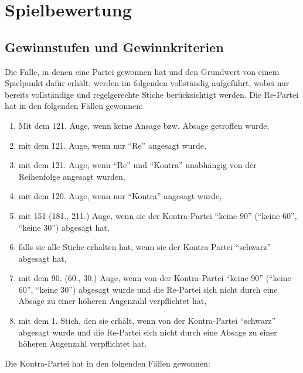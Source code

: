 \documentclass[12pt]{scrartcl}
\begin{document}
\section{Spielbewertung}

\subsection{Gewinnstufen und Gewinnkriterien}
Die Fälle, in denen eine Partei gewonnen hat und den Grundwert von einem Spielpunkt dafür erhält,
werden im folgenden vollständig aufgeführt, wobei nur bereits vollständige
und regelgerechte Stiche berücksichtigt werden.
Die Re-Partei hat in den folgenden Fällen gewonnen:
\begin{enumerate}
  \item Mit dem 121. Auge, wenn keine Ansage bzw. Absage getroffen wurde,
  \item mit dem 121. Auge, wenn nur "`Re"' angesagt wurde,
  \item mit dem 121. Auge, wenn "`Re"' und "`Kontra"' unabhängig von der Reihenfolge angesagt wurden,
  \item mit dem 120. Auge, wenn nur "`Kontra"' angesagt wurde,
  \item mit 151 (181., 211.) Auge, wenn sie der Kontra-Partei "`keine 90"' ("`keine 60"', "`keine 30"') abgesagt hat,
  \item falls sie alle Stiche erhalten hat, wenn sie der Kontra-Partei "`schwarz"' abgesagt hat,
  \item mit dem 90. (60., 30.) Auge, wenn von der Kontra-Partei "`keine 90"' ("`keine 60"', "`keine 30"') abgesagt
    wurde und die Re-Partei sich nicht durch eine Absage zu einer höheren Augenzahl verpflichtet hat,
  \item mit dem 1. Stich, den sie erhält, wenn von der Kontra-Partei "`schwarz"' abgesagt wurde und die Re-Partei
    sich nicht durch eine Absage zu einer höheren Augenzahl verpflichtet hat.
\end{enumerate}
Die Kontra-Partei hat in den folgenden Fällen gewonnen:
\end{document}
